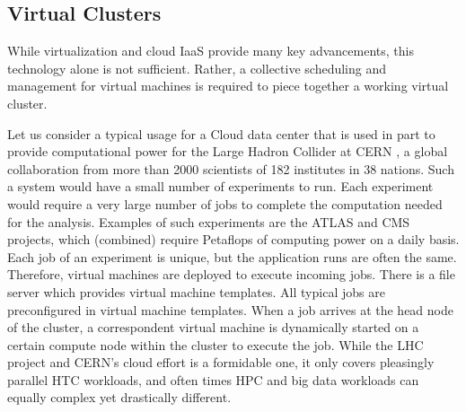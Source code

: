

\subsection{Virtual Clusters}

While virtualization and cloud IaaS provide many key advancements, this technology alone is not sufficient.  Rather, a collective scheduling and management for virtual machines is required to piece together a working virtual cluster.  

Let us consider a typical usage for a Cloud data center that is used in part to provide computational power for the Large Hadron Collider at CERN \cite{CERN2003}, a global collaboration from more than 2000 scientists of 182 institutes in 38 nations.  Such a system would have a small number of experiments to run. Each experiment would require a very large number of jobs to complete the computation needed for the analysis.  Examples of such experiments are the ATLAS \cite{luo2005gsp} and CMS \cite{cms} projects, which (combined) require Petaflops of computing power on a daily basis.  Each job of an experiment is unique, but the application runs are often the same.  Therefore, virtual machines are deployed to execute incoming jobs. There is a file server which provides virtual machine templates. All typical jobs are preconfigured in virtual machine templates. When a job arrives at the head node of the  cluster, a correspondent virtual machine is dynamically started on a certain compute node within the cluster to execute the job.  While the LHC project and CERN's cloud effort is a formidable one, it only covers pleasingly parallel HTC workloads, and often times HPC and big data workloads can equally complex yet drastically different.


